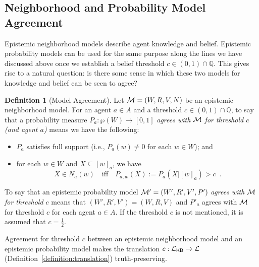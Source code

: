 \documentclass[12pt]{article}
\theoremstyle{definition}
\newtheorem{definition}[theorem]{Definition}
\newcommand{\Rat}{\mathbb{Q}}  %
\newcommand{\M}{{\cal M}}      %
\newcommand{\Lang}{{\cal L}}   %
\newcommand{\KB}{{\mathsf{KB}}}                        %
\begin{document}
\subsection{Neighborhood and Probability Model Agreement}

Epistemic neighborhood models describe agent knowledge and belief.
Epistemic probability models can be used for the same purpose along
the lines we have discussed above once we establish a belief threshold
$c\in(0,1)\cap\Rat$.  This gives rise to a natural question: is there
some sense in which these two models for knowledge and belief can be
seen to agree?

\begin{definition}[Model Agreement]
  Let $\M=(W,R,V,N)$ be an epistemic neighborhood model. For an agent
  $a\in A$ and a threshold $c\in(0,1)\cap\Rat$, to say that a
  probability measure $P_a:\wp(W)\to[0,1]$ \emph{agrees with $\M$ for
    threshold $c$ (and agent $a$)} means we have the following:
  \begin{itemize}
  \item $P_a$ satisfies full support (i.e., $P_a(w)\neq0$ for each
    $w\in W$); and

  \item for each $w\in W$ and $X\subseteq[w]_a$, we have
    \[
    X\in N_a(w) \quad\text{iff}\quad
    P_{a,w}(X):=P_a(X|[w]_a)>c\enspace.
    \]
  \end{itemize}
  To say that an epistemic probability model $\M'=(W',R',V',P')$
  \emph{agrees with $\M$ for threshold $c$} means that
  $(W',R',V')=(W,R,V)$ and $P'_a$ agrees with $\M$ for threshold $c$
  for each agent $a\in A$.  If the threshold $c$ is not mentioned, it
  is assumed that $c=\frac 12$.
\end{definition}

Agreement for threshold $c$ between an epistemic neighborhood model
and an epistemic probability model makes the translation
$c:\Lang_\KB\to\Lang$ (Definition~\ref{definition:translation})
truth-preserving.
\end{document}
